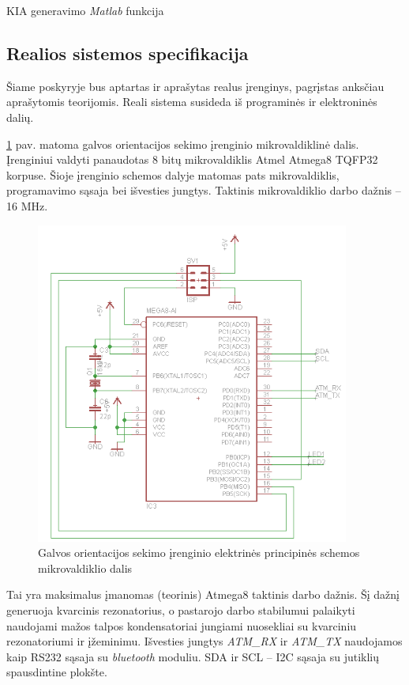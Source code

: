 \documentclass[]{vgtuef}
\begin{document}
{\begin{cfigure}
  \centering
  \caption{KIA generavimo \textit{Matlab} funkcija}
  \label{code:RIA_gen}
  
\end{cfigure}

\newpage
\subsection{Realios sistemos specifikacija}

Šiame poskyryje bus aptartas ir aprašytas realus įrenginys, pagrįstas anksčiau aprašytomis teorijomis. Reali sistema susideda iš programinės ir elektroninės dalių.

\ref{fig:headtracker_schematic} pav. matoma galvos orientacijos sekimo įrenginio mikrovaldiklinė dalis. Įrenginiui valdyti panaudotas 8 bitų mikrovaldiklis Atmel Atmega8 TQFP32 korpuse. Šioje įrenginio schemos dalyje matomas pats mikrovaldiklis, programavimo sąsaja bei išvesties jungtys. Taktinis mikrovaldiklio darbo dažnis – 16 MHz.

\begin{figure}[htbp]
  \centering
  \includegraphics[width=390px]{img/headtracker_schematic.png}
  \caption{Galvos orientacijos sekimo įrenginio elektrinės principinės schemos mikrovaldiklio dalis}
  \label{fig:headtracker_schematic}
\end{figure}

Tai yra maksimalus įmanomas (teorinis) Atmega8 taktinis darbo dažnis. Šį dažnį generuoja kvarcinis rezonatorius, o pastarojo darbo stabilumui palaikyti naudojami mažos talpos kondensatoriai jungiami nuosekliai su kvarciniu rezonatoriumi ir įžeminimu. Išvesties jungtys \textit{ATM\_RX} ir \textit{ATM\_TX} naudojamos kaip RS232 sąsaja su \textit{bluetooth} moduliu. SDA ir SCL – I2C  sąsaja su jutiklių spausdintine plokšte.

}
\end{document}
